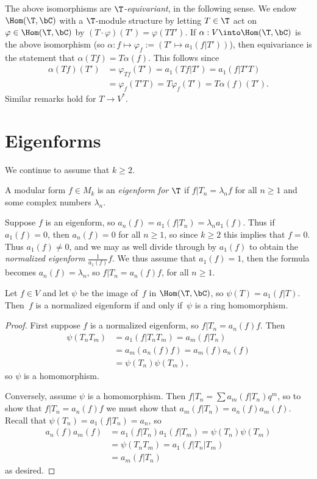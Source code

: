\documentclass{report}
\begin{document}
\begin{remark}
The above isomorphisms are {\em $\T$-equivariant}, in the
following sense.
We endow $\Hom(\T,\bC)$ with a $\T$-module structure by letting $T\in\T$ act
on $\varphi\in\Hom(\T,\bC)$ by
$(T\cdot\varphi)(T')=\varphi(TT')$. If $\alpha:V\into\Hom(\T,\bC)$
is the above isomorphism
(so $\alpha:f\mapsto\varphi_f:=(T'\mapsto a_1(f|T'))$),
then equivariance is the statement that $\alpha(Tf)=T\alpha(f).$
This follows since
\begin{align*}
\alpha(Tf)(T')&=\varphi_{Tf}(T')=a_1(Tf|T')=a_1(f|T'T)\\
&=\varphi_{f}(T'T)=T\varphi_{f}(T')=T\alpha(f)(T').
\end{align*}
Similar remarks hold for $T\to V^*$.
\end{remark}

\section{Eigenforms}
We continue to assume that $k\geq 2$.
\begin{defn}
A modular form $f\in M_k$ is an {\em eigenform for $\T$} if
$f|T_n=\lambda_n f$ for all $n\geq 1$ and some complex numbers $\lambda_n$.
\end{defn}
Suppose $f$ is an eigenform, so
$a_n(f)=a_1(f|T_n)=\lambda_n a_1(f)$.
Thus if $a_1(f)=0$, then $a_n(f)=0$ for all $n\geq 1$, so
since $k\geq 2$ this implies that $f=0$. Thus $a_1(f)\neq 0$,
and we may as well divide through by $a_1(f)$ to obtain
the {\em normalized eigenform} $\frac{1}{a_1(f)}f$. We thus
assume that $a_1(f)=1$, then the formula becomes $a_n(f)=\lambda_n$,
so $f|T_n = a_n(f) f$, for all $n\geq 1$.

\begin{theorem}
Let $f\in V$ and let $\psi$ be the image of~$f$
in $\Hom(\T,\bC)$, so $\psi(T)=a_1(f|T)$.
Then~$f$ is a normalized eigenform if and only if~$\psi$ is a
ring homomorphism.
\end{theorem}

\begin{proof}
First suppose $f$ is a normalized eigenform, so $f|T_n=a_n(f)f$.
Then
\begin{align*}
\psi(T_nT_m) &=a_1(f|T_nT_m)=a_m(f|T_n)\\
             &=a_m(a_n(f)f)=a_m(f)a_n(f)\\
             &=\psi(T_n)\psi(T_m),
\end{align*}
so $\psi$ is a homomorphism.

Conversely, assume $\psi$ is a homomorphism. Then
$f|T_n=\sum a_m(f|T_n)q^m$, so to show that $f|T_n=a_n(f)f$
we must show that $a_m(f|T_n)=a_n(f)a_m(f)$. Recall that %
$\psi(T_n)=a_1(f|T_n)=a_n$, so
\begin{align*}
a_n(f)a_m(f) &= a_1(f|T_n)a_1(f|T_m) = \psi(T_n)\psi(T_m) \\
             & = \psi(T_n T_m) = a_1(f|T_n|T_m) \\
             & = a_m(f| T_n)
\end{align*}
as desired.

\end{proof}
\end{document}
